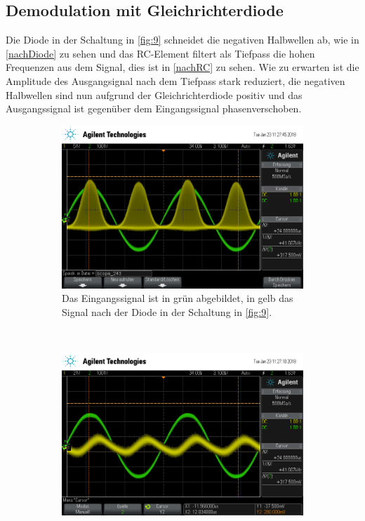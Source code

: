 \subsection{Demodulation mit Gleichrichterdiode}
\label{De-AM}

Die Diode in der Schaltung in \autoref{fig:9} schneidet die negativen Halbwellen ab, wie in \autoref{nachDiode} zu sehen und das RC-Element filtert als Tiefpass die hohen Frequenzen aus dem Signal, dies ist in \autoref{nachRC} zu sehen. Wie zu erwarten ist die Amplitude des Ausgangsignal nach dem Tiefpass stark reduziert, die negativen Halbwellen sind nun aufgrund der Gleichrichterdiode positiv und das Ausgangssignal ist gegenüber dem Eingangssignal phasenverschoben.

\begin{figure}[t!]
	\centering
	\begin{subfigure}[t]{0.5\textwidth}
		\centering
		\includegraphics[width=\textwidth]{img/g_scope_243.png}
		\caption{Das Eingangssignal ist in grün abgebildet, in gelb das Signal nach der Diode in der Schaltung in \autoref{fig:9}.}
		\label{nachDiode}
	\end{subfigure}%
	~
	\begin{subfigure}[t]{0.5\textwidth}
		\centering
		\includegraphics[width=\textwidth]{img/g_scope_242.png}

\end{subfigure}
\end{figure}
